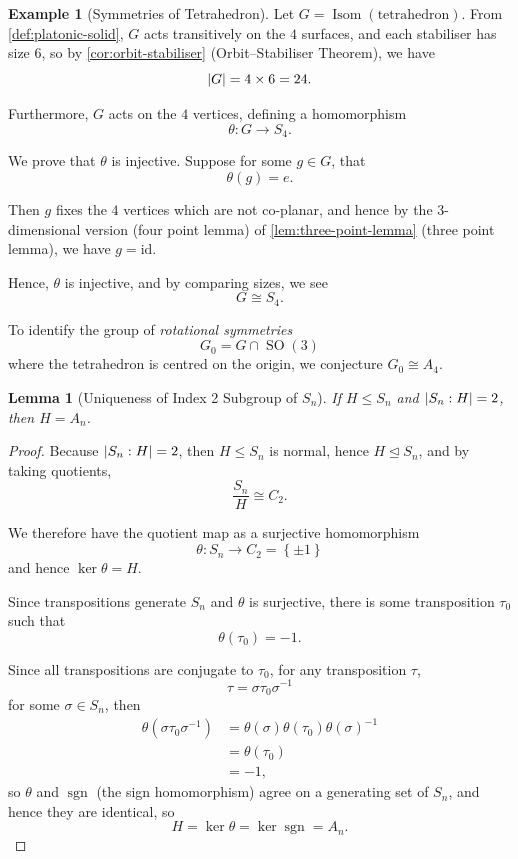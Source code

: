\documentclass{article}
\newtheorem{lemma}[theorem]{Lemma}
\theoremstyle{definition}
\newtheorem*{example*}{Example}
\theoremstyle{remark}
\DeclarePairedDelimiter{\abs}{\lvert}{\rvert}
\newcommand{\pqty}[1]{\left(#1\right)}
\newcommand{\Bqty}[1]{\left\{#1\right\}}
\newcommand{\flatfrac}[2]{\frac{#1}{#2}}
\newcommand{\functiondomain}[3]{#1:#2\to #3}
\newcommand{\inverse}{^{-1}}
\newcommand{\isomorphic}{\cong}
\newcommand{\normalsub}{\trianglelefteq}
\newcommand{\subgroup}{\leq}
\newcommand{\identity}{\mathrm{id}}
\newcommand{\sign}{\operatorname{sgn}}
\newcommand{\Isom}{\operatorname{Isom}}
\newcommand{\SO}{\operatorname{SO}}
\begin{document}
\begin{example*}[Symmetries of Tetrahedron]
    Let \(G = \Isom\pqty{\text{tetrahedron}}\). From \autoref{def:platonic-solid}, \(G\) acts transitively on the \(4\) surfaces, and each stabiliser has size \(6\), so by \autoref{cor:orbit-stabiliser} (Orbit--Stabiliser Theorem), we have
    \[
        \abs{G} = 4 \times 6 = 24.
    \]

    Furthermore, \(G\) acts on the \(4\) vertices, defining a homomorphism
    \[
        \functiondomain{\theta}{G}{S_4}.
    \]

    We prove that \(\theta\) is injective. Suppose for some \(g \in G\), that
    \[
        \theta\pqty{g} = e.
    \]

    Then \(g\) fixes the \(4\) vertices which are not co-planar, and hence by the 3-dimensional version (four point lemma) of \autoref{lem:three-point-lemma} (three point lemma), we have \(g = \identity\).
    
    Hence, \(\theta\) is injective, and by comparing sizes, we see
    \[
        G \isomorphic S_4.
    \]
\end{example*}

To identify the group of \emph{rotational symmetries}
\[
    G_0 = G \cap \SO\pqty{3}
\]
where the tetrahedron is centred on the origin, we conjecture \(G_0 \isomorphic A_4\).

\begin{lemma}[Uniqueness of Index 2 Subgroup of \(S_n\)]
    \label{lem:uniqueness-index-2-subgroup}
    If \(H \subgroup S_n\) and \(\abs{S_n : H} = 2\), then \(H = A_n\).
\end{lemma}

\begin{proof}
    Because \(\abs{S_n : H} = 2\), then \(H \subgroup S_n\) is normal, hence \(H \normalsub S_n\), and by taking quotients,
    \[
        \flatfrac{S_n}{H} \isomorphic C_2.
    \]

    We therefore have the quotient map as a surjective homomorphism
    \[
        \functiondomain{\theta}{S_n}{C_2 = \Bqty{\pm 1}}
    \]
    and hence \(\ker \theta = H\).

    Since transpositions generate \(S_n\) and \(\theta\) is surjective, there is some transposition \(\tau_0\) such that
    \[
        \theta \pqty{\tau_0} = -1.
    \]

    Since all transpositions are conjugate to \(\tau_0\), for any transposition \(\tau\),
    \[
        \tau = \sigma \tau_0 \sigma\inverse
    \]
    for some \(\sigma \in S_n\), then
    \begin{align*}
        \theta \pqty{\sigma \tau_0 \sigma\inverse} &= \theta\pqty{\sigma} \theta\pqty{\tau_0} \theta\pqty{\sigma}\inverse \\
        &= \theta\pqty{\tau_0} \\
        &= -1,
    \end{align*}
    so \(\theta\) and \(\sign\) (the sign homomorphism) agree on a generating set of \(S_n\), and hence they are identical, so
    \[
        H = \ker \theta = \ker \sign = A_n.
    \]
\end{proof}
\end{document}
